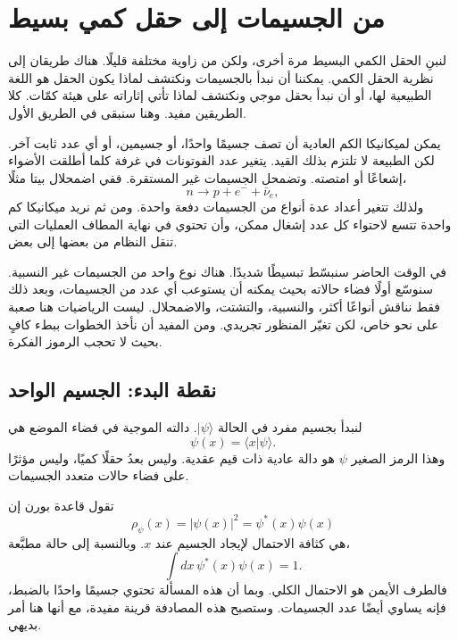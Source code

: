 \chapter{من الجسيمات إلى حقل كمي بسيط}

لنبنِ الحقل الكمي البسيط مرة أخرى، ولكن من زاوية مختلفة قليلًا. هناك طريقان إلى نظرية الحقل الكمي. يمكننا أن نبدأ بالجسيمات ونكتشف لماذا يكون الحقل هو اللغة الطبيعية لها، أو أن نبدأ بحقل موجي ونكتشف لماذا تأتي إثاراته على هيئة كمّات. كلا الطريقين مفيد. وهنا سنبقى في الطريق الأول.

يمكن لميكانيكا الكم العادية أن تصف جسيمًا واحدًا، أو جسيمين، أو أي عدد ثابت آخر. لكن الطبيعة لا تلتزم بذلك القيد. يتغير عدد الفوتونات في غرفة كلما أطلقت الأضواء إشعاعًا أو امتصته. وتضمحل الجسيمات غير المستقرة. ففي اضمحلال بيتا مثلًا،
\begin{equation}
n\longrightarrow p+e^-+\bar{\nu}_e,
\end{equation}
ولذلك تتغير أعداد عدة أنواع من الجسيمات دفعة واحدة. ومن ثم نريد ميكانيكا كم واحدة تتسع لاحتواء كل عدد إشغال ممكن، وأن تحتوي في نهاية المطاف العمليات التي تنقل النظام من بعضها إلى بعض.

في الوقت الحاضر سنبسّط تبسيطًا شديدًا. هناك نوع واحد من الجسيمات غير النسبية. سنوسّع أولًا فضاء حالاته بحيث يمكنه أن يستوعب أي عدد من الجسيمات، وبعد ذلك فقط نناقش أنواعًا أكثر، والنسبية، والتشتت، والاضمحلال. ليست الرياضيات هنا صعبة على نحو خاص، لكن تغيّر المنظور تجريدي. ومن المفيد أن نأخذ الخطوات ببطء كافٍ بحيث لا تحجب الرموز الفكرة.

\section{نقطة البدء: الجسيم الواحد}

لنبدأ بجسيم مفرد في الحالة \(|\psi\rangle\). دالته الموجية في فضاء الموضع هي
\begin{equation}
\psi(x)=\langle x|\psi\rangle.
\label{eq:l07-wavefunction}
\end{equation}
وهذا الرمز الصغير \(\psi\) هو دالة عادية ذات قيم عقدية. وليس بعدُ حقلًا كميًا، وليس مؤثرًا على فضاء حالات متعدد الجسيمات.

تقول قاعدة بورن إن
\begin{equation}
\rho_\psi(x)=|\psi(x)|^2=\psi^*(x)\psi(x)
\label{eq:l07-born-density}
\end{equation}
هي كثافة الاحتمال لإيجاد الجسيم عند \(x\). وبالنسبة إلى حالة مطبَّعة،
\begin{equation}
\int dx\,\psi^*(x)\psi(x)=1.
\label{eq:l07-one-particle-normalization}
\end{equation}
فالطرف الأيمن هو الاحتمال الكلي. وبما أن هذه المسألة تحتوي جسيمًا واحدًا بالضبط، فإنه يساوي أيضًا عدد الجسيمات. وستصبح هذه المصادفة قرينة مفيدة، مع أنها هنا أمر بديهي.

